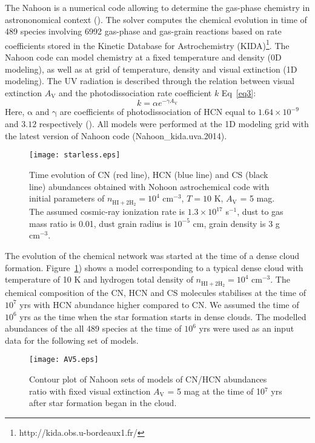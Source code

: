 \documentclass{aa}
\begin{document}
The Nahoon is a numerical code allowing to determine the gas-phase chemistry in astrononomical context  (\citealt{Wak12}). The solver computes the chemical evolution in time of 489 species involving 6992 gas-phase and gas-grain reactions based on rate coefficients stored in the Kinetic Database for Astrochemistry (KIDA)\footnote{http://kida.obs.u-bordeaux1.fr/}. The Nahoon code can model chemistry at a fixed temperature and density (0D modeling), as well as at grid of temperature, density and visual extinction (1D modeling). The UV radiation is described through the relation between visual extinction $A_\mathrm{V}$ and the photodissociation rate coefficient $k$ Eq~\ref{eq3}:
\begin{equation} \label{eq3}
k = \alpha e^{-\gamma A_\mathrm{V}}
\end{equation}
Here, $\mathrm{\alpha}$ and $\mathrm{\gamma}$ are coefficients of photodissociation of HCN equal to $1.64\times10^{-9}$ and $3.12$ respectively (\cite{Hea17}). 
All models were performed at the 1D modeling grid with the latest version of Nahoon code (Nahoon\_kida.uva.2014).


\begin{figure}
\centering
\texttt{[image: starless.eps]}
\caption{Time evolution of CN (red line), HCN (blue line) and CS (black line) abundances obtained with Nohoon astrochemical code with initial parameters of $n_\mathrm{HI+2 \dot H_2} = 10^4$ cm$^{-3}$, $T = 10$ K, $A_\mathrm{V}$ = 5 mag. The assumed cosmic-ray ionization rate is $1.3\times10^{17}$ s$^{-1}$, dust to gas mass ratio is 0.01, dust grain radius is $10^{-5}$ cm, grain density is 3 g cm$^{-3}$.}
\label{starless}
\end{figure}

The evolution of the chemical network was started at the time of a dense cloud formation. Figure~\ref{starless}) shows a model corresponding to a typical dense cloud with temperature of 10 K and hydrogen total density of $n_\mathrm{HI+2 \dot H_2} = 10^4$ cm$^{-3}$. The chemical composition of the CN, HCN and CS molecules stabilises at the time of $10^{7}$ yrs with HCN abundance higher compared to CN. We assumed the time of $10^{6}$ yrs as the time when the star formation starts in dense clouds. The modelled abundances of the all 489 species at the time of $10^{6}$ yrs were used as an input data for the following set of models.

\begin{figure}
\centering
\texttt{[image: AV5.eps]}
\caption{Contour plot of Nahoon sets of models of CN/HCN abundances ratio with fixed visual extinction $A_\mathrm{V}$ = 5 mag at the time of 10$^{7}$ yrs after star formation began in the cloud.} 
\label{AV5}
\end{figure}
\end{document}
